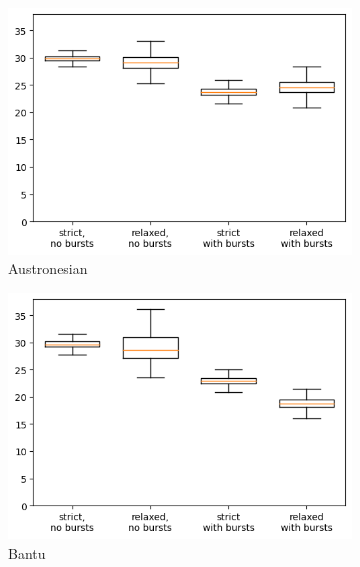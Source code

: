 \documentclass[]{rsos}%
\begin{document}
\begin{figure}
  \centering
  \begin{subfigure}{0.4\textwidth}
    \includegraphics[width=\textwidth]{supplement/analysis/austronesian_replacement.png}
    \caption{Austronesian}
  \end{subfigure}
  \begin{subfigure}{0.4\textwidth}
    \includegraphics[width=\textwidth]{supplement/analysis/bantu_replacement.png}
    \caption{Bantu}
  \end{subfigure}
  \begin{subfigure}{0.4\textwidth}

\end{subfigure}
\end{figure}
\end{document}
